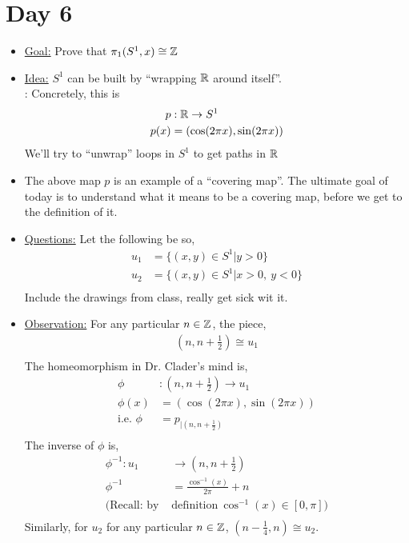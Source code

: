 \section{Day 6}
    \begin{itemize}
        \item \underline{Goal:} Prove that $\pi_{1}(S^1, x)\cong \mathbb{Z}$
        \item \underline{Idea:} $S^1$ can be built by ``wrapping $\mathbb{R}$ around itself''.\\:
            Concretely, this is
            \begin{align*}
                p&: \mathbb{R} \rightarrow S^1\\
                p(x)&=(\cos(2\pi x), \sin(2\pi x))\\
            \end{align*}
            We'll try to ``unwrap'' loops in $S^1$ to get paths in $\mathbb{R}$
        \item
            The above map $p$ is an example of a ``covering map''. The ultimate goal of today is to understand
            what it means to be a covering map, before we get to the definition of it.\\
        \item \underline{Questions:} Let the following be so,
            \begin{align*}
                u_1&=\{(x,y)\in S^1| y>0\}\\
                u_2&=\{(x,y)\in S^1| x>0,\ y<0\}\\
            \end{align*}
            Include the drawings from class, really get sick wit it.
        \item \underline{Observation:} For any particular $n\in \mathbb{Z}$, the piece,
            \begin{align*}
                (n, n+\frac{1}{2})\cong u_1\\
            \end{align*}
            The homeomorphism in Dr. Clader's mind is,
            \begin{align*}
                \phi&: (n,n+\frac{1}{2})\rightarrow u_1\\
                \phi(x)&=(\cos(2\pi x), \sin(2\pi x))\\
                \text{i.e. } \phi&=p_{|(n,n+\frac{1}{2})}\\
            \end{align*}
            The inverse of $\phi$ is,
            \begin{align*}
                \phi^{-1}: u_1&\rightarrow(n,n+\frac{1}{2})\\
                \phi^{-1}&=\frac{\cos^{-1} (x)}{2\pi}+n\\
                (\text{Recall: by }&\text{definition}\ \cos^{-1}(x)\in[0,\pi])\\
            \end{align*}
            Similarly, for $u_2$ for any particular $n\in \mathbb{Z}$, $(n-\frac{1}{4}, n)\cong u_2$.
    \end{itemize}
